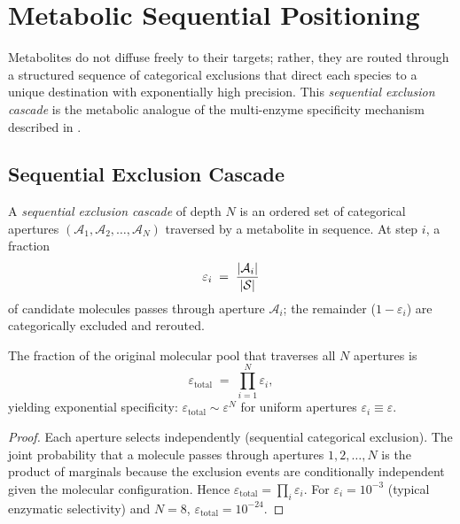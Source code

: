 \section{Metabolic Sequential Positioning}
\label{sec:ch03-metabolic-positioning}

Metabolites do not diffuse freely to their targets; rather, they are
routed through a structured sequence of categorical exclusions that
direct each species to a unique destination with exponentially high
precision.  This \emph{sequential exclusion cascade} is the metabolic
analogue of the multi-enzyme specificity mechanism described in
.

\subsection{Sequential Exclusion Cascade}

\begin{definition}
\label{def:ch03-sec-cascade}
A \emph{sequential exclusion cascade} of depth $N$ is an ordered set of
categorical apertures $(\mathcal{A}_1,\mathcal{A}_2,\ldots,\mathcal{A}_N)$
traversed by a metabolite in sequence.  At step $i$, a fraction
\begin{equation}
    \varepsilon_i \;=\; \frac{|\mathcal{A}_i|}{|\mathcal{S}|}
    \label{eq:ch03-eps-i}
\end{equation}
of candidate molecules passes through aperture $\mathcal{A}_i$; the
remainder ($1-\varepsilon_i$) are categorically excluded and rerouted.
\end{definition}

\begin{theorem}
\label{thm:ch03-total-exclusion}
The fraction of the original molecular pool that traverses all $N$
apertures is
\begin{equation}
    \varepsilon_{\mathrm{total}}
    \;=\;
    \prod_{i=1}^{N}\varepsilon_i,
    \label{eq:ch03-eps-total}
\end{equation}
yielding exponential specificity: $\varepsilon_{\mathrm{total}}\sim
\varepsilon^N$ for uniform apertures $\varepsilon_i\equiv\varepsilon$.
\end{theorem}

\begin{proof}
Each aperture selects independently (sequential categorical exclusion).
The joint probability that a molecule passes through apertures
$1,2,\ldots,N$ is the product of marginals because the exclusion events are
conditionally independent given the molecular configuration.  Hence
$\varepsilon_{\mathrm{total}}=\prod_i\varepsilon_i$.  For
$\varepsilon_i=10^{-3}$ (typical enzymatic selectivity) and $N=8$,
$\varepsilon_{\mathrm{total}}=10^{-24}$.
\end{proof}

